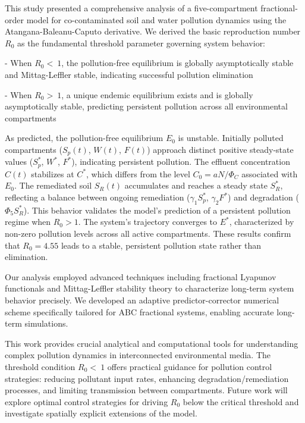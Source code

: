 \documentclass[10pt]{NSP1}
\begin{document}
\par\medskip{}\smallskip

This study presented a comprehensive analysis of a five-compartment fractional-order model for co-contaminated soil and water pollution dynamics using the Atangana-Baleanu-Caputo derivative. We derived the basic reproduction number \(R_{0}\) as the fundamental threshold parameter governing system behavior:

- When \(R_{0} < \ 1\), the pollution-free equilibrium is globally asymptotically stable and Mittag-Leffler stable, indicating successful pollution elimination

- When \(R_{0} > \ 1\), a unique endemic equilibrium exists and is globally asymptotically stable, predicting persistent pollution across all environmental compartments

As predicted, the pollution-free equilibrium \(E_{0}\) is unstable. Initially polluted compartments (\(S_{p}(t)\), \(W(t)\), \(F(t)\)) approach distinct positive steady-state values (\(S_{p}^{*}\), \(W^{*}\), \(F^{*}\)), indicating persistent pollution. The effluent concentration \(C(t)\) stabilizes at \(C^{*}\), which differs from the level \(C_{0} = aN/\Phi_{C}\) associated with \(E_{0}\). The remediated soil \(S_{R}(t)\) accumulates and reaches a steady state \(S_{R}^{*}\), reflecting a balance between ongoing remediation (\(\gamma_{1}S_{p}^{*}\), \(\gamma_{2}F^{*}\)) and degradation (\(\Phi_{5}S_{R}^{*}\)). This behavior validates the model’s prediction of a persistent pollution regime when \(R_{0} > 1\). The system’s trajectory converges to \(E^{*}\), characterized by non-zero pollution levels across all active compartments. These results confirm that \(R_{0} = 4.55\) leads to a stable, persistent pollution state rather than elimination.

Our analysis employed advanced techniques including fractional Lyapunov functionals and Mittag-Leffler stability theory to characterize long-term system behavior precisely. We developed an adaptive predictor-corrector numerical scheme specifically tailored for ABC fractional systems, enabling accurate long-term simulations.

This work provides crucial analytical and computational tools for understanding complex pollution dynamics in interconnected environmental media. The threshold condition \(R_{0} < \ 1\) offers practical guidance for pollution control strategies: reducing pollutant input rates, enhancing degradation/remediation processes, and limiting transmission between compartments. Future work will explore optimal control strategies for driving \(R_{0}\) below the critical threshold and investigate spatially explicit extensions of the model.
\end{document}
